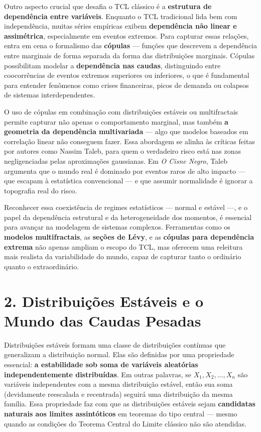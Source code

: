 \documentclass[
]{agujournal2019}
\begin{document}
Outro aspecto crucial que desafia o TCL clássico é a \textbf{estrutura
de dependência entre variáveis}. Enquanto o TCL tradicional lida bem com
independência, muitas séries empíricas exibem \textbf{dependência não
linear e assimétrica}, especialmente em eventos extremos. Para capturar
essas relações, entra em cena o formalismo das \textbf{cópulas} ---
funções que descrevem a dependência entre marginais de forma separada da
forma das distribuições marginais. Cópulas possibilitam modelar a
\textbf{dependência nas caudas}, distinguindo entre coocorrências de
eventos extremos superiores ou inferiores, o que é fundamental para
entender fenômenos como crises financeiras, picos de demanda ou colapsos
de sistemas interdependentes.

O uso de cópulas em combinação com distribuições estáveis ou
multifractais permite capturar não apenas o comportamento marginal, mas
também \textbf{a geometria da dependência multivariada} --- algo que
modelos baseados em correlação linear não conseguem fazer. Essa
abordagem se alinha às críticas feitas por autores como Nassim Taleb,
para quem o verdadeiro risco está nas zonas negligenciadas pelas
aproximações gaussianas. Em \emph{O Cisne Negro}, Taleb argumenta que o
mundo real é dominado por eventos raros de alto impacto --- que escapam
à estatística convencional --- e que assumir normalidade é ignorar a
topografia real do risco.

Reconhecer essa coexistência de regimes estatísticos --- normal e
estável ---, e o papel da dependência estrutural e da heterogeneidade
dos momentos, é essencial para avançar na modelagem de sistemas
complexos. Ferramentas como os \textbf{modelos multifractais}, as
\textbf{seções de Lévy}, e as \textbf{cópulas para dependência extrema}
não apenas ampliam o escopo do TCL, mas oferecem uma releitura mais
realista da variabilidade do mundo, capaz de capturar tanto o ordinário
quanto o extraordinário.

\section{2. Distribuições Estáveis e o Mundo das Caudas
Pesadas}\label{distribuiuxe7uxf5es-estuxe1veis-e-o-mundo-das-caudas-pesadas}

Distribuições estáveis formam uma classe de distribuições contínuas que
generalizam a distribuição normal. Elas são definidas por uma
propriedade essencial: \textbf{a estabilidade sob soma de variáveis
aleatórias independentemente distribuídas}. Em outras palavras, se
\(X_1, X_2, \dots, X_n\) são variáveis independentes com a mesma
distribuição estável, então sua soma (devidamente reescalada e
recentrada) seguirá uma distribuição da mesma família. Essa propriedade
faz com que as distribuições estáveis sejam \textbf{candidatas naturais
aos limites assintóticos} em teoremas do tipo central --- mesmo quando
as condições do Teorema Central do Limite clássico não são atendidas.
\end{document}
